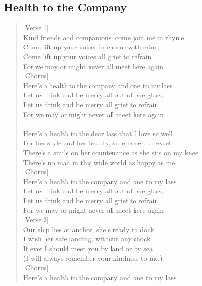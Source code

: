\documentclass[11pt]{article}
\begin{document}
\subsection{Health to the Company}
\label{sec:orgd52877c}
\begin{verse}
[Verse 1]\\
Kind friends and companions, come join me in rhyme\\
Come lift up your voices in chorus with mine;\\
Come lift up your voices all grief to refrain\\
For we may or might never all meet here again\\
\vspace*{1em}
[Chorus]\\
Here's a health to the company and one to my lass\\
Let us drink and be merry all out of one glass;\\
Let us drink and be merry all grief to refrain\\
For we may or might never all meet here again\\
[Verse 2]\\
Here's a health to the dear lass that I love so well\\
For her style and her beauty, sure none can excel\\
There's a smile on her countenance as she sits on my knee\\
There's no man in this wide world as happy as me\\
\vspace*{1em}
[Chorus]\\
Here's a health to the company and one to my lass\\
Let us drink and be merry all out of one glass;\\
Let us drink and be merry all grief to refrain\\
For we may or might never all meet here again\\
\vspace*{1em}
[Verse 3]\\
Our ship lies at anchor, she's ready to dock\\
I wish her safe landing, without any shock\\
If ever I should meet you by land or by sea\\
(I will always remember your kindness to me.)\\
\vspace*{1em}
[Chorus]\\
Here's a health to the company and one to my lass\\

\end{verse}
\end{document}
